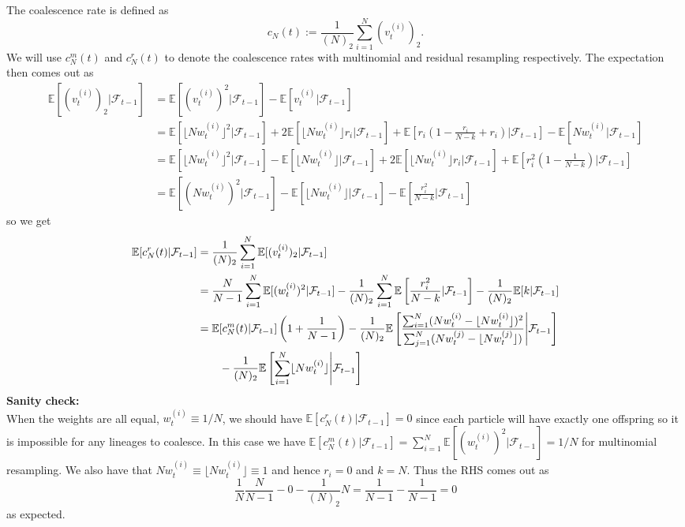 \documentclass[fleqn]{article}
\newcommand{\E}{\mathbb{E}}
\newcommand{\F}{\mathcal{F}_{t-1}}
\newcommand{\vt}[2][t]{v_{#1}^{(#2)}}
\newcommand{\wt}[2][t]{w_{#1}^{(#2)}}
\begin{document}
The coalescence rate is defined as
\begin{equation*}
c_N(t) := \frac{1}{(N)_2} \sum_{i=1}^{N} (\vt{i})_2.
\end{equation*}
We will use $c_N^m(t)$ and $c_N^r(t)$ to denote the coalescence rates with multinomial and residual resampling respectively.
The expectation then comes out as
\begin{align*}
\E[(\vt{i})_2 |\F] &= \E[(\vt{i})^2 |\F] - \E[\vt{i} |\F] \\
&= \E[\lfloor N\wt{i} \rfloor^2 |\F] + 2 \E[\lfloor N\wt{i} \rfloor r_i |\F] + \E\left[ r_i \left(1 - \frac{r_i}{N-k} + r_i \right) |\F \right] - \E[N\wt{i} |\F] \\
&=\E[ \lfloor N\wt{i} \rfloor^2 |\F] - \E[ \lfloor N\wt{i} \rfloor |\F] + 2 \E[ \lfloor N\wt{i} \rfloor r_i |\F] + \E\left[ r_i^2 \left(1- \frac{1}{N-k} \right) |\F\right] \\
&= \E[ (N\wt{i})^2 |\F] - \E[ \lfloor N\wt{i} \rfloor |\F] - \E\left[ \frac{r_i^2}{N-k} |\F \right]
\end{align*}
so we get
\begin{align}
\E[c^r_N(t) |\F] &=  \frac{1}{(N)_2}  \sum_{i=1}^{N} \E[(\vt{i})_2 |\F ]\notag\\
&= \frac{N}{N-1} \sum_{i=1}^{N} \E[(\wt{i})^2 |\F] - \frac{1}{(N)_2} \sum_{i=1}^{N} \E\left[ \frac{r_i^2}{N-k} |\F \right] - \frac{1}{(N)_2} \E[k |\F] \notag\\
&= \E[c^{m}_N(t) |\F] \left( 1 + \frac{1}{N-1} \right) - \frac{1}{(N)_2}  \E\left[ \frac{\sum_{i=1}^{N} (N\wt{i} - \lfloor N\wt{i}\rfloor)^2}{\sum_{j=1}^{N} (N\wt{j} - \lfloor N\wt{j}\rfloor)} \middle|\F \right] \notag\\
&\qquad -\frac{1}{(N)_2} \E \left[ \sum_{i=1}^{N} \lfloor N\wt{i}\rfloor \middle|\F \right]
\label{eq:cNt_1}
\end{align}
\textbf{Sanity check:}\\
When the weights are all equal, $\wt{i} \equiv 1/N$, we should have $\E[c^r_N(t) |\F] = 0$ since each particle will have exactly one offspring so it is impossible for any lineages to coalesce. In this case we have $\E[c^{m}_N(t) |\F] = \sum_{i=1}^{N} \E[(\wt{i})^2 |\F] = 1/N$ for multinomial resampling. We also have that $N\wt{i} \equiv \lfloor N\wt{i} \rfloor \equiv 1$ and hence $r_i = 0$ and $k=N$. Thus the RHS comes out as
\begin{equation*}
\frac{1}{N}\frac{N}{N-1} - 0 - \frac{1}{(N)_2} N = \frac{1}{N-1} - \frac{1}{N-1} = 0
\end{equation*}
as expected.
\end{document}
